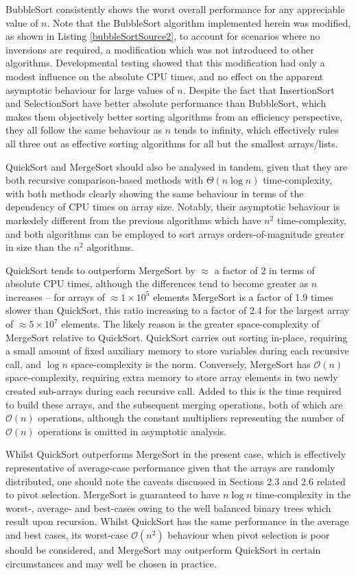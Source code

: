 \documentclass[12pt,a4paper]{article}
\begin{document}
BubbleSort consistently shows the worst overall performance for any appreciable value of $n$. Note that the BubbleSort algorithm implemented herein was modified, as shown in Listing \ref{bubbleSortSource2}, to account for scenarios where no inversions are required, a modification which was not introduced to other algorithms. Developmental testing showed that this modification had only a modest influence on the absolute CPU times, and no effect on the apparent asymptotic behaviour for large values of $n$. Despite the fact that InsertionSort and SelectionSort have better absolute performance than BubbleSort, which makes them objectively better sorting algorithms from an efficiency perspective, they all follow the same behaviour as $n$ tends to infinity, which effectively rules all three out as effective sorting algorithms for all but the smallest arrays/lists.

QuickSort and MergeSort should also be analysed in tandem, given that they are both recursive comparison-based methods with $\Theta(n \log n)$ time-complexity, with both methods clearly showing the same behaviour in terms of the dependency of CPU times on array size. Notably, their asymptotic behaviour is markedely different from the previous algorithms which have $n^2$ time-complexity, and both algorithms can be employed to sort arrays orders-of-magnitude greater in size than the $n^2$ algorithms. 

QuickSort tends to outperform MergeSort by $\approx$ a factor of 2 in terms of absolute CPU times, although the differences tend to become greater as $n$ increases -- for arrays of $\approx 1 \times 10^5$ elements MergeSort is a factor of 1.9 times slower than QuickSort, this ratio increasing to a factor of 2.4 for the largest array of $\approx 5\times10^7$ elements. The likely reason is the greater space-complexity of MergeSort relative to QuickSort. QuickSort carries out sorting in-place, requiring a small amount of fixed auxiliary memory to store variables during each recursive call, and $\log n$ space-complexity is the norm. Conversely, MergeSort has $\mathcal{O}(n)$ space-complexity, requiring extra memory to store array elements in two newly created sub-arrays during each recursive call. Added to this is the time required to build these arrays, and the subsequent merging operations, both of which are $\mathcal{O}(n)$ operations, although the constant multipliers representing the number of $\mathcal{O}(n)$ operations is omitted in asymptotic analysis.

Whilst QuickSort outperforms MergeSort in the present case, which is effectively representative of average-case performance given that the arrays are randomly distributed, one should note the caveats discussed in Sections 2.3 and 2.6 related to pivot selection. MergeSort is guaranteed to have $n\log n$ time-complexity in the worst-, average- and best-cases owing to the well balanced binary trees which result upon recursion. Whilst QuickSort has the same performance in the average and best cases, its worst-case $\mathcal{O}(n^2)$ behaviour when pivot selection is poor should be considered, and MergeSort may outperform QuickSort in certain circumstances and may well be chosen in practice.
\end{document}
